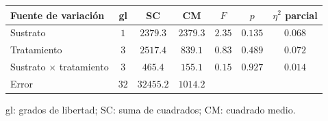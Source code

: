 \begin{tabular}{lcccccc}
\hline\hline
\textbf{Fuente de variaci\'on} & \textbf{gl} & \textbf{SC} & \textbf{CM} & \textbf{$F$} & \textbf{$p$} & \textbf{$\eta^2$ parcial} \\
\hline
Sustrato & $1$ & $2379.3$ & $2379.3$ & $2.35$ & $0.135$ & $0.068$ \\
Tratamiento & $3$ & $2517.4$ & $839.1$ & $0.83$ & $0.489$ & $0.072$ \\
Sustrato $\times$ tratamiento & $3$ & $465.4$ & $155.1$ & $0.15$ & $0.927$ & $0.014$ \\
Error & $32$ & $32455.2$ & $1014.2$ &  &  &  \\
\hline
\end{tabular}
\par\vspace{4pt}
\parbox{0.94\linewidth}{\footnotesize gl: grados de libertad; SC: suma de cuadrados; CM: cuadrado medio.}
